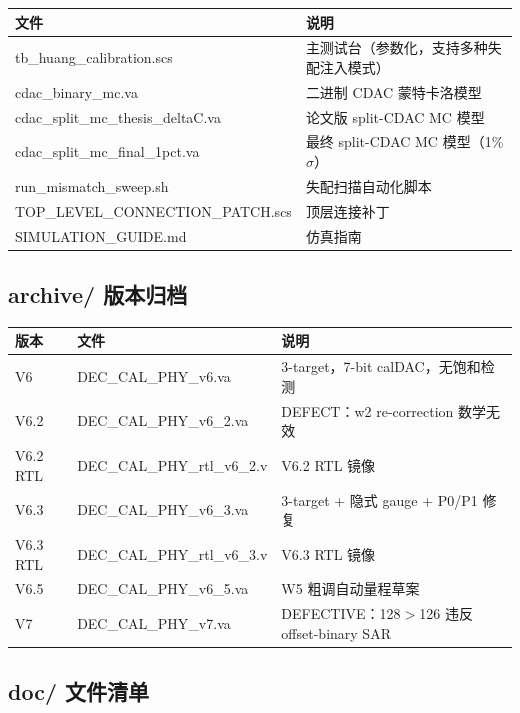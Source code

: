 \documentclass[UTF8,a4paper,12pt]{ctexart}
\theoremstyle{definition}
\begin{document}
\begin{longtable}{p{5cm}p{9cm}}
\toprule
\textbf{文件} & \textbf{说明} \\
\midrule
\endhead
\bottomrule
\endfoot
tb\_huang\_calibration.scs & 主测试台（参数化，支持多种失配注入模式） \\
cdac\_binary\_mc.va & 二进制 CDAC 蒙特卡洛模型 \\
cdac\_split\_mc\_thesis\_deltaC.va & 论文版 split-CDAC MC 模型 \\
cdac\_split\_mc\_final\_1pct.va & 最终 split-CDAC MC 模型（1\% $\sigma$） \\
run\_mismatch\_sweep.sh & 失配扫描自动化脚本 \\
TOP\_LEVEL\_CONNECTION\_PATCH.scs & 顶层连接补丁 \\
SIMULATION\_GUIDE.md & 仿真指南 \\
\bottomrule
\end{longtable}

\subsection{archive/ 版本归档}

\begin{longtable}{p{3cm}p{4cm}p{7cm}}
\toprule
\textbf{版本} & \textbf{文件} & \textbf{说明} \\
\midrule
\endhead
\bottomrule
\endfoot
V6 & DEC\_CAL\_PHY\_v6.va & 3-target，7-bit calDAC，无饱和检测 \\
V6.2 & DEC\_CAL\_PHY\_v6\_2.va & DEFECT：w2 re-correction 数学无效 \\
V6.2 RTL & DEC\_CAL\_PHY\_rtl\_v6\_2.v & V6.2 RTL 镜像 \\
V6.3 & DEC\_CAL\_PHY\_v6\_3.va & 3-target + 隐式 gauge + P0/P1 修复 \\
V6.3 RTL & DEC\_CAL\_PHY\_rtl\_v6\_3.v & V6.3 RTL 镜像 \\
V6.5 & DEC\_CAL\_PHY\_v6\_5.va & W5 粗调自动量程草案 \\
V7 & DEC\_CAL\_PHY\_v7.va & DEFECTIVE：128$>$126 违反 offset-binary SAR \\
\bottomrule
\end{longtable}

\subsection{doc/ 文件清单}
\end{document}
